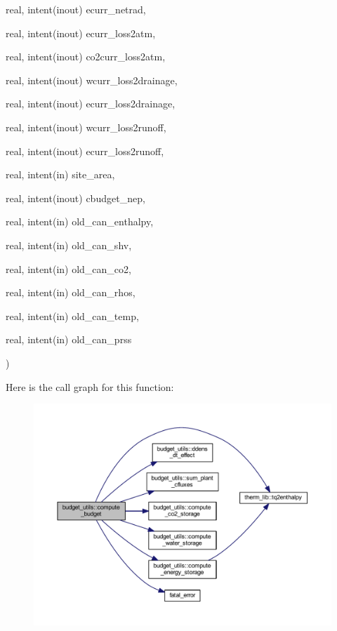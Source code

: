 {\begin{DoxyParamCaption}
\item[{real, intent(inout)}]{ecurr\+\_\+netrad, }
\item[{real, intent(inout)}]{ecurr\+\_\+loss2atm, }
\item[{real, intent(inout)}]{co2curr\+\_\+loss2atm, }
\item[{real, intent(inout)}]{wcurr\+\_\+loss2drainage, }
\item[{real, intent(inout)}]{ecurr\+\_\+loss2drainage, }
\item[{real, intent(inout)}]{wcurr\+\_\+loss2runoff, }
\item[{real, intent(inout)}]{ecurr\+\_\+loss2runoff, }
\item[{real, intent(in)}]{site\+\_\+area, }
\item[{real, intent(inout)}]{cbudget\+\_\+nep, }
\item[{real, intent(in)}]{old\+\_\+can\+\_\+enthalpy, }
\item[{real, intent(in)}]{old\+\_\+can\+\_\+shv, }
\item[{real, intent(in)}]{old\+\_\+can\+\_\+co2, }
\item[{real, intent(in)}]{old\+\_\+can\+\_\+rhos, }
\item[{real, intent(in)}]{old\+\_\+can\+\_\+temp, }
\item[{real, intent(in)}]{old\+\_\+can\+\_\+prss}
\end{DoxyParamCaption}
)}\hypertarget{namespacebudget__utils_ade80ff8e17018f7bd86015ee5f20375e}{}\label{namespacebudget__utils_ade80ff8e17018f7bd86015ee5f20375e}


Here is the call graph for this function\+:\nopagebreak
\begin{figure}[H]
\begin{center}
\leavevmode
\includegraphics[width=350pt]{namespacebudget__utils_ade80ff8e17018f7bd86015ee5f20375e_cgraph}
\end{center}
\end{figure}


